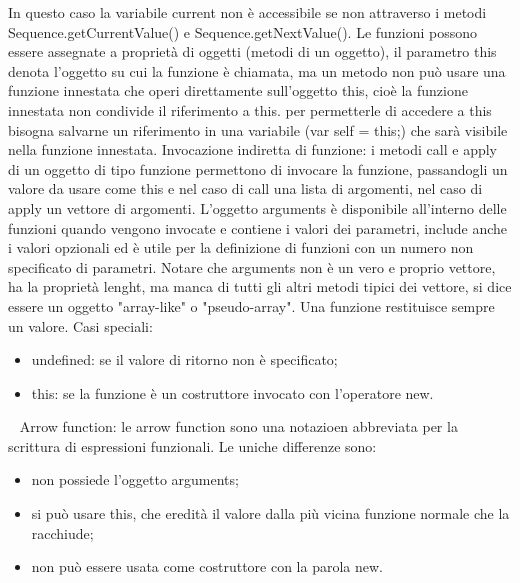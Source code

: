 In questo caso la variabile current non è accessibile se non attraverso i metodi Sequence.getCurrentValue() e Sequence.getNextValue().\newline
\newline
Le funzioni possono essere assegnate a proprietà di oggetti (metodi di un oggetto), il parametro this denota l'oggetto su cui la funzione è chiamata, ma un metodo non può usare una funzione innestata che operi direttamente sull'oggetto this, cioè la funzione innestata non condivide il riferimento a this. per permetterle di accedere a this bisogna salvarne un riferimento in una variabile (var self = this;) che sarà visibile nella funzione innestata.\newline
\newline
Invocazione indiretta di funzione: i metodi call e apply di un oggetto di tipo funzione permettono di invocare la funzione, passandogli un valore da usare come this e nel caso di call una lista di argomenti, nel caso di apply un vettore di argomenti.\newline
\newline
L'oggetto arguments è disponibile all'interno delle funzioni quando vengono invocate e contiene i valori dei parametri, include anche i valori opzionali ed è utile per la definizione di funzioni con un numero non specificato di parametri. Notare che arguments non è un vero e proprio vettore, ha la proprietà lenght, ma manca di tutti gli altri metodi tipici dei vettore, si dice essere un oggetto "array-like" o "pseudo-array".\newline
\newline
Una funzione restituisce sempre un valore. Casi speciali:
\begin{itemize}
    \item undefined: se il valore di ritorno non è specificato;
    \item this: se la funzione è un costruttore invocato con l'operatore new.
\end{itemize}
\ \newline
Arrow function: le arrow function sono una notazioen abbreviata per la scrittura di espressioni funzionali. Le uniche differenze sono:
\begin{itemize}
    \item non possiede l'oggetto arguments;
    \item si può usare this, che eredità il valore dalla più vicina funzione normale che la racchiude;
    \item non può essere usata come costruttore con la parola new.
\end{itemize}
